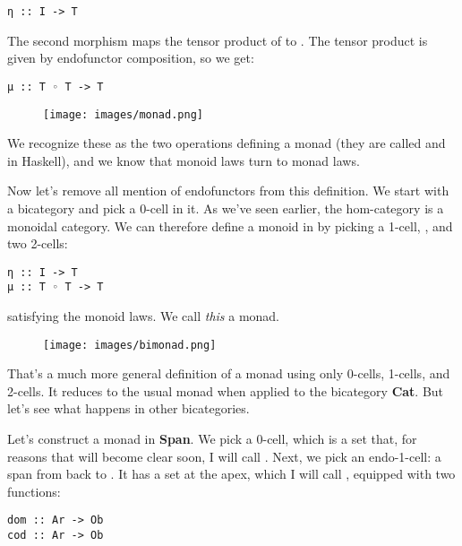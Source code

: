 \begin{Verbatim}[commandchars=\\\{\}]
η :: I -> T
\end{Verbatim}
The second morphism maps the tensor product of  to
. The tensor product is given by endofunctor composition, so
we get:

\begin{Verbatim}[commandchars=\\\{\}]
μ :: T ◦ T -> T
\end{Verbatim}

\begin{figure}[H]
\centering
\texttt{[image: images/monad.png]}
\end{figure}

\noindent
We recognize these as the two operations defining a monad (they are
called  and  in Haskell), and we know that
monoid laws turn to monad laws.

Now let's remove all mention of endofunctors from this definition. We
start with a bicategory  and pick a 0-cell  in it.
As we've seen earlier, the hom-category  is a monoidal
category. We can therefore define a monoid in  by
picking a 1-cell, , and two 2-cells:

\begin{Verbatim}[commandchars=\\\{\}]
η :: I -> T
μ :: T ◦ T -> T
\end{Verbatim}
satisfying the monoid laws. We call \emph{this} a monad.

\begin{figure}[H]
\centering
\texttt{[image: images/bimonad.png]}
\end{figure}

\noindent
That's a much more general definition of a monad using only 0-cells,
1-cells, and 2-cells. It reduces to the usual monad when applied to the
bicategory \textbf{Cat}. But let's see what happens in other
bicategories.

Let's construct a monad in \textbf{Span}. We pick a 0-cell, which is a
set that, for reasons that will become clear soon, I will call
. Next, we pick an endo-1-cell: a span from  back
to . It has a set at the apex, which I will call ,
equipped with two functions:

\begin{Verbatim}[commandchars=\\\{\}]
dom :: Ar -> Ob
cod :: Ar -> Ob
\end{Verbatim}

